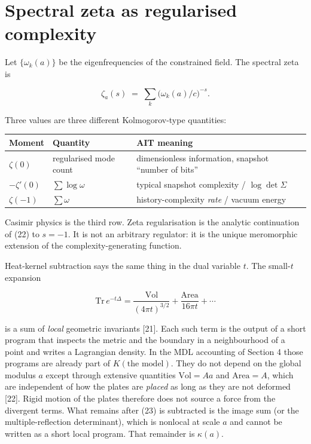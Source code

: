 \documentclass[11pt,letterpaper]{article}
\begin{document}
\section{Spectral zeta as regularised complexity}


Let \(\{\omega_k(a)\}\) be the eigenfrequencies of the constrained field. The spectral zeta is


\[
\zeta_a(s)\;=\;\sum_k\bigl(\omega_k(a)/c\bigr)^{-s}.
\tag{22}
\]


Three values are three different Kolmogorov-type quantities:


\begin{center}
{\small
\begin{tabular}{>{\raggedright\arraybackslash}p{}>{\raggedright\arraybackslash}p{}>{\raggedright\arraybackslash}p{}}
\toprule
\textbf{Moment} & \textbf{Quantity} & \textbf{AIT meaning} \\
\midrule
\(\zeta(0)\) & regularised mode count & dimensionless information, snapshot “number of bits” \\
\(-\zeta'(0)\) & \(\sum\log\omega\) & typical snapshot complexity / \(\log\det\Sigma\) \\
\(\zeta(-1)\) & \(\sum\omega\) & history-complexity \emph{rate} / vacuum energy \\
\bottomrule
\end{tabular}
}
\end{center}


Casimir physics is the third row. Zeta regularisation is the analytic continuation of (22) to \(s=-1\). It is not an arbitrary regulator: it is the unique meromorphic extension of the complexity-generating function.


Heat-kernel subtraction says the same thing in the dual variable \(t\). The small-\(t\) expansion


\[
\mathrm{Tr}\,e^{-t\Delta}
=\frac{\mathrm{Vol}}{(4\pi t)^{3/2}}+\frac{\mathrm{Area}}{16\pi t}+\cdots
\tag{23}
\]


is a sum of \emph{local} geometric invariants [21]. Each such term is the output of a short program that inspects the metric and the boundary in a neighbourhood of a point and writes a Lagrangian density. In the MDL accounting of Section 4 those programs are already part of \(K(\text{the model})\). They do not depend on the global modulus \(a\) except through extensive quantities \(\mathrm{Vol}=Aa\) and \(\mathrm{Area}=A\), which are independent of how the plates are \emph{placed} as long as they are not deformed [22]. Rigid motion of the plates therefore does not source a force from the divergent terms. What remains after (23) is subtracted is the image sum (or the multiple-reflection determinant), which is nonlocal at scale \(a\) and cannot be written as a short local program. That remainder is \(\kappa(a)\).
\end{document}
